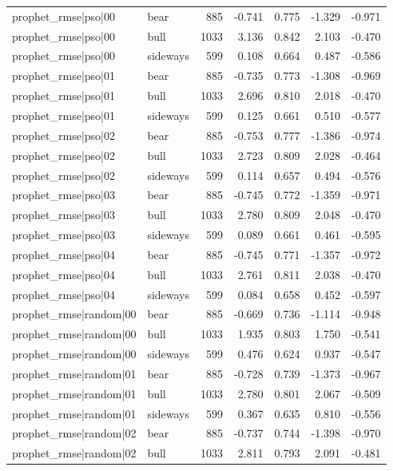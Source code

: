\begin{table}
\begin{tabular}{llrrrrr}
prophet\_rmse|pso|00 & bear & 885 & -0.741 & 0.775 & -1.329 & -0.971 \\
prophet\_rmse|pso|00 & bull & 1033 & 3.136 & 0.842 & 2.103 & -0.470 \\
prophet\_rmse|pso|00 & sideways & 599 & 0.108 & 0.664 & 0.487 & -0.586 \\
prophet\_rmse|pso|01 & bear & 885 & -0.735 & 0.773 & -1.308 & -0.969 \\
prophet\_rmse|pso|01 & bull & 1033 & 2.696 & 0.810 & 2.018 & -0.470 \\
prophet\_rmse|pso|01 & sideways & 599 & 0.125 & 0.661 & 0.510 & -0.577 \\
prophet\_rmse|pso|02 & bear & 885 & -0.753 & 0.777 & -1.386 & -0.974 \\
prophet\_rmse|pso|02 & bull & 1033 & 2.723 & 0.809 & 2.028 & -0.464 \\
prophet\_rmse|pso|02 & sideways & 599 & 0.114 & 0.657 & 0.494 & -0.576 \\
prophet\_rmse|pso|03 & bear & 885 & -0.745 & 0.772 & -1.359 & -0.971 \\
prophet\_rmse|pso|03 & bull & 1033 & 2.780 & 0.809 & 2.048 & -0.470 \\
prophet\_rmse|pso|03 & sideways & 599 & 0.089 & 0.661 & 0.461 & -0.595 \\
prophet\_rmse|pso|04 & bear & 885 & -0.745 & 0.771 & -1.357 & -0.972 \\
prophet\_rmse|pso|04 & bull & 1033 & 2.761 & 0.811 & 2.038 & -0.470 \\
prophet\_rmse|pso|04 & sideways & 599 & 0.084 & 0.658 & 0.452 & -0.597 \\
prophet\_rmse|random|00 & bear & 885 & -0.669 & 0.736 & -1.114 & -0.948 \\
prophet\_rmse|random|00 & bull & 1033 & 1.935 & 0.803 & 1.750 & -0.541 \\
prophet\_rmse|random|00 & sideways & 599 & 0.476 & 0.624 & 0.937 & -0.547 \\
prophet\_rmse|random|01 & bear & 885 & -0.728 & 0.739 & -1.373 & -0.967 \\
prophet\_rmse|random|01 & bull & 1033 & 2.780 & 0.801 & 2.067 & -0.509 \\
prophet\_rmse|random|01 & sideways & 599 & 0.367 & 0.635 & 0.810 & -0.556 \\
prophet\_rmse|random|02 & bear & 885 & -0.737 & 0.744 & -1.398 & -0.970 \\
prophet\_rmse|random|02 & bull & 1033 & 2.811 & 0.793 & 2.091 & -0.481 \\

\end{tabular}
\end{table}
